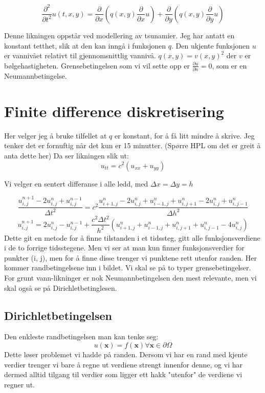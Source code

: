 \documentclass[a4paper, 10pt]{article}
\newcommand{\mb}{\mathbf}
\newcommand{\p}{\partial}
\begin{document}
\begin{equation}
	\frac{\p^2}{\p t^2} u(t, x, y) = \frac{\p}{\p x} \left(q(x, y) \frac{\p}{\p x} u\right) + \frac{\p}{\p y} \left(q(x, y) \frac{\p}{\p y} u\right)
\end{equation}

Denne likningen oppstår ved modellering av tsunamier. Jeg har antatt en konstant tetthet, slik at den kan inngå i funksjonen $q$. Den ukjente funksjonen $u$ er vannivået relativt til gjennomsnittlig vannivå. $q(x, y) = v(x, y)^2$ der $v$ er bølgehastigheten. Grensebetingelsen som vi vil sette opp er $\frac{\p u}{\p n} = 0$, som er en Neumannbetingelse.


\section{Finite difference diskretisering}

Her velger jeg å bruke tilfellet at $q$ er konstant, for å få litt mindre å skrive. Jeg tenker det er fornuftig når det kun er 15 minutter. 
(Spørre HPL om det er greit å anta dette her)
Da ser likningen slik ut:
\begin{equation}
	u_{tt} = c^2(u_{xx} + u_{yy})
\end{equation}

Vi velger en sentert differanse i alle ledd, med $\Delta x = \Delta y = h$

\begin{equation}
	\frac{u_{i, j}^{n+1} - 2u_{i,j}^n + u_{i, j}^{n-1}}{\Delta t^2} = c^2\frac{u_{i+1, j}^n - 2u_{i, j}^n + u_{i-1, j}^n + u_{i, j+1}^n - 2u_{i, j}^n + u_{i, j-1}^n}{\Delta h^2}
\end{equation}
\begin{equation}
	u_{i, j}^{n+1} = 2u_{i,j}^n - u_{i,j}^{n-1} + \frac{c^2 \Delta t^2}{h^2}\left( u_{i+1, j}^n + u_{i-1, j}^n + u_{i, j+1}^n + u_{i, j-1}^n - 4u_{i,j}^n\right)
\end{equation}
Dette git en metode for å finne tilstanden i et tidssteg, gitt alle funksjonsverdiene i de to forrige tidsstegene. Men vi ser at man kun finner funksjonsverdier for punkter (i, j), men for å finne disse trenger vi punktene rett utenfor randen. Her kommer randbetingelsene inn i bildet. Vi skal se på to typer grensebetingelser. For grunt vann-likninger er nok Neumannbetingelsen den mest relevante, men vi skal også se på Dirichletbetinglesen. 

\subsection{Dirichletbetingelsen}
Den enkleste randbetingelsen man kan tenke seg:
\begin{equation}
	u(\mb{x}) = f(\mb{x}) \forall \mb{x} \in \p\Omega
\end{equation}
Dette løser problemet vi hadde på randen. Dersom vi har en rand med kjente verdier trenger vi bare å regne ut verdiene strengt innenfor denne, og vi har dermed alltid tilgang til verdier som ligger ett hakk "utenfor" de verdiene vi regner ut. 
\end{document}
